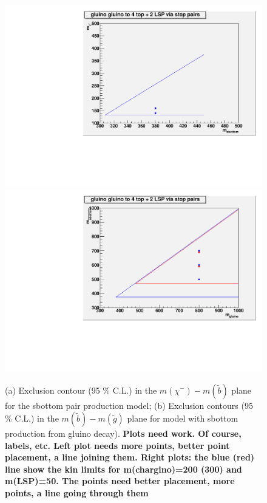 \begin{figure}[thb]
\begin{center}
\includegraphics[width=0.49\linewidth]{figs/sbottom_fkw.pdf}
\includegraphics[width=0.49\linewidth]{figs/gluinoSbottom_fkw.pdf}
\caption{(a) 
Exclusion contour (95 \% C.L.) in the 
$m(\chi^{-})-m(\widetilde{b})$ 
plane for the sbottom pair production model; 
(b) Exclusion contours (95 \% C.L.) in the $m(\widetilde{b})-m(\widetilde{g})$
plane for model with sbottom production from gluino decay).
{\bf Plots need work.  Of course, labels, etc. 
Left plot needs more points, better point placement, a line joining them.
Right plots: the blue (red) line show the kin limits for m(chargino)=200 (300)
and m(LSP)=50.  The points need better placement, more points, a line going 
through them} 
\label{fig:sbottompaper}}
\end{center}
\end{figure}




\clearpage
